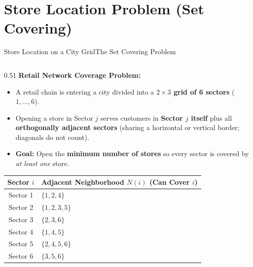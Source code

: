 \documentclass[aspectratio=169]{beamer}
\begin{document}
\section{Store Location Problem (Set Covering)}
\begin{frame}\sectionpage\end{frame}

\begin{frame}{Store Location on a City Grid}{The Set Covering Problem}
\begin{columns}[T,onlytextwidth]
\begin{column}{0.51\textwidth}
  \scriptsize
  \textbf{Retail Network Coverage Problem:}
  \begin{itemize}\setlength{\itemsep}{1.5pt}
    \item A retail chain is entering a city divided into a \textbf{$2 \times 3$ grid of 6 sectors} ($1, \dots, 6$).
    \item Opening a store in Sector $j$ serves customers in \textbf{Sector $j$ itself} plus all \textbf{orthogonally adjacent sectors} (sharing a horizontal or vertical border; diagonals do not count).
    \item \textbf{Goal:} Open the \textbf{minimum number of stores} so every sector is covered by \emph{at least one} store.
  \end{itemize}
  \vspace{2pt}
  \centering
  {\scriptsize\setlength{\tabcolsep}{4pt}
  \begin{tabular}{@{}cl@{}}
    \toprule
    \textbf{Sector $i$} & \textbf{Adjacent Neighborhood $N(i)$ (Can Cover $i$)} \\
    \midrule
    Sector 1 & $\{1, 2, 4\}$ \\
    Sector 2 & $\{1, 2, 3, 5\}$ \\
    Sector 3 & $\{2, 3, 6\}$ \\
    Sector 4 & $\{1, 4, 5\}$ \\
    Sector 5 & $\{2, 4, 5, 6\}$ \\
    Sector 6 & $\{3, 5, 6\}$ \\
    \bottomrule
  \end{tabular}}

\end{column}
\end{columns}
\end{frame}
\end{document}
